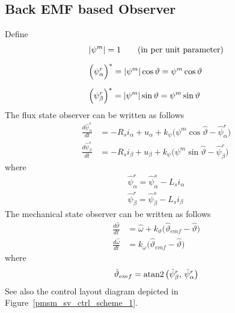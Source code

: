 \documentclass[12pt,a4paper]{scrartcl}
\begin{document}
\begin{onehalfspace}
\subsection{Back EMF based Observer}
Define
\begin{align}
	&\abs{\psi^m} = 1\qquad\text{(in per unit parameter)} \label{emf_state_obse_eq1} \\[6pt]
	&\Big(\psi_{\alpha}^r\Big)^* = \abs{\psi^m}\cos\vartheta = \psi^m\cos\vartheta \label{emf_state_obse_eq2} \\[6pt]
	&\Big(\psi_{\beta}^r\Big)^* = \abs{\psi^m}\sin\vartheta = \psi^m\sin\vartheta \label{emf_state_obse_eq3}
\end{align}
The flux state observer can be written as follows
\begin{align}
	\frac{d\hat{\psi}_{\alpha}^s}{dt} &= -R_s i_{\alpha} + u_{\alpha} + k_\psi \Big(\psi^m\cos\hat{\vartheta}-\hat{\psi}_{\alpha}^r\Big) \label{emf_state_obse_eq4} \\[6pt]
	\frac{d\hat{\psi}_{\beta}^s}{dt} &= -R_s i_{\beta} + u_{\beta} + k_\psi \Big(\psi^m\sin\hat{\vartheta}-\hat{\psi}_{\beta}^r\Big) \label{emf_state_obse_eq5}
\end{align}
where
\begin{align}
	\hat{\psi}_{\alpha}^r = \hat{\psi}_{\alpha}^s -L_s i_{\alpha} \label{emf_state_obse_eq6} \\[6pt]
	\hat{\psi}_{\beta}^r = \hat{\psi}_{\beta}^s -L_s i_{\beta} \label{emf_state_obse_eq7}
\end{align}
The mechanical state observer can be written as follows
\begin{align}
	\frac{d\hat{\vartheta}}{dt} &= \hat{\omega} + k_{\vartheta}\Big(\hat{\vartheta}_{emf} - \hat{\vartheta}\Big) \label{emf_state_obse_eq8} \\[6pt]
	\frac{d\hat{\omega}}{dt} &= k_{\omega}\Big(\hat{\vartheta}_{emf} - \hat{\vartheta}\Big) \label{emf_state_obse_eq9}
\end{align}
where 
\begin{align}
	\hat{\vartheta}_{emf} = \operatorname{atan2}\big(\hat{\psi}_{\beta}^r,\,\hat{\psi}_{\alpha}^r\big) \label{emf_state_obse_eq10}
\end{align}
See also the control layout diagram depicted in Figure~\ref{pmsm_sv_ctrl_scheme_1}.


\end{onehalfspace}
\end{document}
